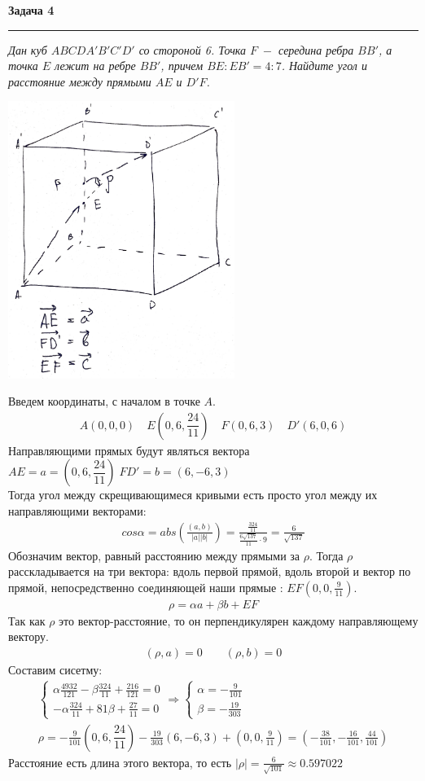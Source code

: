 \documentclass[a4paper,11pt]{article}
\begin{document}
\textbf{\large Задача 4}
\medskip\hrule\medskip
\textit{Дан куб $ ABCDA'B'C'D' $ со стороной 6. Точка $ F \; - $ середина ребра $ BB' $, а точка $ E $ лежит на ребре $ BB' $, причем $ BE : EB' = 4  :  7 $. Найдите угол и расстояние между прямыми $ AE $ и $ D'F $. } 
\begin{center}
	\includegraphics[height = 90mm]{cub.pdf	}
\end{center}
Введем координаты, с началом в точке $ A $.
\begin{gather*}
A (0, 0, 0) \quad E (0, 6, \dfrac{24}{11}) \quad F (0, 6, 3) \quad D' (6, 0, 6)
\end{gather*}   
Направляющими прямых будут являться вектора $ AE = a = (0, 6, \dfrac{24}{11}) \; FD' = b = (6, -6, 3)$ \\
Тогда угол между скрещивающимеся кривыми есть просто угол между их направляющими векторами:
\begin{gather*}
cos \alpha = abs(\frac{(a, b)}{|a||b|}) = \frac{\frac{324}{11}}{\frac{6\sqrt{137}}{11} \cdot 9} = \frac{6}{\sqrt{137}}
\end{gather*}
Обозначим вектор, равный расстоянию между прямыми за $ \rho $. Тогда $ \rho $ расскладывается на три вектора: вдоль первой прямой, вдоль второй и вектор по прямой, непосредственно соединяющей наши прямые : $ EF (0, 0, \frac9{11}) $.
\begin{gather*}
\rho = \alpha a + \beta b + EF
\end{gather*}
Так как $ \rho $ это вектор-расстояние, то он перпендикулярен каждому направляющему вектору.
\begin{gather*}
(\rho, a) = 0 \qquad (\rho, b) = 0
\end{gather*}
Составим сисетму:
\begin{gather*}
\begin{cases}
\alpha \frac{4932}{121} - \beta\frac{324}{11} + \frac{216}{121}= 0 \\[2pt]
-\alpha \frac{324}{11} + 81\beta + \frac{27}{11} = 0
\end{cases} \Rightarrow
\begin{cases}
\alpha = -\frac{9}{101} \\ \beta = -\frac{19}{303}
\end{cases} \\
\rho =  -\frac{9}{101} (0, 6, \dfrac{24}{11}) - \frac{19}{303}(6, -6, 3) + (0, 0, \frac{9}{11}) = (-\frac{38}{101}, -\frac{16}{101}, \frac{44}{101})
\end{gather*}
Расстояние есть длина этого вектора, то есть $ |\rho| = \frac{6}{\sqrt{101}} \approx 0.597022 $
\end{document}

